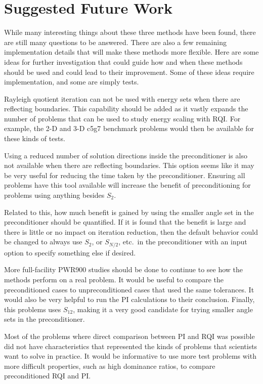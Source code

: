 \section{Suggested Future Work}
While many interesting things about these three methods have been found, there are still many questions to be answered. There are also a few remaining implementation details that will make these methods more flexible. Here are some ideas for further investigation that could guide how and when these methods should be used and could lead to their improvement. Some of these ideas require implementation, and some are simply tests.

Rayleigh quotient iteration can not be used with energy sets when there are reflecting boundaries. This capability should be added as it vastly expands the number of problems that can be used to study energy scaling with RQI. For example, the 2-D and 3-D c5g7 benchmark problems would then be available for these kinds of tests. 

Using a reduced number of solution directions inside the preconditioner is also not available when there are reflecting boundaries. This option seems like it may be very useful for reducing the time taken by the preconditioner. Ensuring all problems have this tool available will increase the benefit of preconditioning for problems using anything besides $S_{2}$.

Related to this, how much benefit is gained by using the smaller angle set in the preconditioner should be quantified. If it is found that the benefit is large and there is little or no impact on iteration reduction, then the default behavior could be changed to always use $S_{2}$, or $S_{N/2}$, etc.\ in the preconditioner with an input option to specify something else if desired. 

More full-facility PWR900 studies should be done to continue to see how the methods perform on a real problem. It would be useful to compare the preconditioned cases to unpreconditioned cases that used the same tolerances. It would also be very helpful to run the PI calculations to their conclusion. Finally, this problems uses $S_{12}$, making it a very good candidate for trying smaller angle sets in the preconditioner. 

Most of the problems where direct comparison between PI and RQI was possible did not have characteristics that represented the kinds of problems that scientists want to solve in practice. It would be informative to use more test problems with more difficult properties, such as high dominance ratios, to compare preconditioned RQI and PI. 

